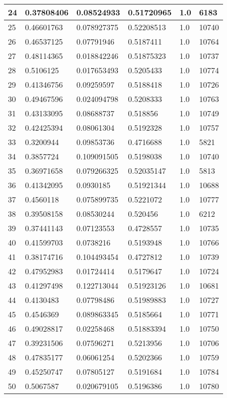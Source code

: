 \begin{longtable}{|l|l|l|l|l|l|}
24 & 0.37808406 & 0.08524933 & 0.51720965 & 1.0 & 6183 \\ \hline 
25 & 0.46601763 & 0.078927375 & 0.52208513 & 1.0 & 10740 \\ \hline 
26 & 0.46537125 & 0.07791946 & 0.5187411 & 1.0 & 10764 \\ \hline 
27 & 0.48114365 & 0.018842246 & 0.51875323 & 1.0 & 10737 \\ \hline 
28 & 0.5106125 & 0.017653493 & 0.5205433 & 1.0 & 10774 \\ \hline 
29 & 0.41346756 & 0.09259597 & 0.5188418 & 1.0 & 10726 \\ \hline 
30 & 0.49467596 & 0.024094798 & 0.5208333 & 1.0 & 10763 \\ \hline 
31 & 0.43133095 & 0.08688737 & 0.518856 & 1.0 & 10749 \\ \hline 
32 & 0.42425394 & 0.08061304 & 0.5192328 & 1.0 & 10757 \\ \hline 
33 & 0.3200944 & 0.09853736 & 0.4716688 & 1.0 & 5821 \\ \hline 
34 & 0.3857724 & 0.109091505 & 0.5198038 & 1.0 & 10740 \\ \hline 
35 & 0.36971658 & 0.079266325 & 0.52035147 & 1.0 & 5813 \\ \hline 
36 & 0.41342095 & 0.0930185 & 0.51921344 & 1.0 & 10688 \\ \hline 
37 & 0.4560118 & 0.075899735 & 0.5221072 & 1.0 & 10777 \\ \hline 
38 & 0.39508158 & 0.08530244 & 0.520456 & 1.0 & 6212 \\ \hline 
39 & 0.37441143 & 0.07123553 & 0.4728557 & 1.0 & 10735 \\ \hline 
40 & 0.41599703 & 0.0738216 & 0.5193948 & 1.0 & 10766 \\ \hline 
41 & 0.38174716 & 0.104493454 & 0.4727812 & 1.0 & 10739 \\ \hline 
42 & 0.47952983 & 0.01724414 & 0.5179647 & 1.0 & 10724 \\ \hline 
43 & 0.41297498 & 0.122713044 & 0.51923126 & 1.0 & 10681 \\ \hline 
44 & 0.4130483 & 0.07798486 & 0.51989883 & 1.0 & 10727 \\ \hline 
45 & 0.4546369 & 0.089863345 & 0.5185664 & 1.0 & 10771 \\ \hline 
46 & 0.49028817 & 0.02258468 & 0.51883394 & 1.0 & 10750 \\ \hline 
47 & 0.39231506 & 0.07596271 & 0.5213956 & 1.0 & 10706 \\ \hline 
48 & 0.47835177 & 0.06061254 & 0.5202366 & 1.0 & 10759 \\ \hline 
49 & 0.45250747 & 0.07805127 & 0.5191684 & 1.0 & 10784 \\ \hline 
50 & 0.5067587 & 0.020679105 & 0.5196386 & 1.0 & 10780 \\ \hline 
\end{longtable}